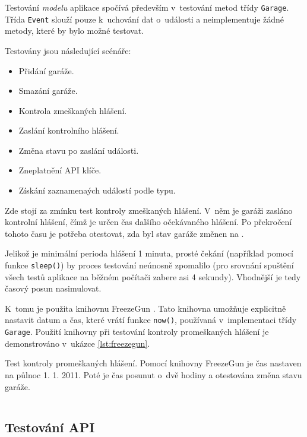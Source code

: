 Testování \textit{modelu} aplikace spočívá především v~testování metod třídy \texttt{Garage}. Třída \texttt{Event} slouží pouze k~uchování dat o~události a neimplementuje žádné metody, které by bylo možné testovat.

Testovány jsou následující scénáře:

\begin{itemize}
    \item Přidání garáže.
    \item Smazání garáže.
    \item Kontrola zmeškaných hlášení.
    \item Zaslání kontrolního hlášení.
    \item Změna stavu po zaslání události.
    \item Zneplatnění API klíče.
    \item Získání zaznamenaých událostí podle typu.
\end{itemize}

Zde stojí za zmínku test kontroly zmeškaných hlášení. V~něm je garáži zasláno kontrolní hlášení, čímž je určen čas dalšího očekávaného hlášení. Po překročení tohoto času je potřeba otestovat, zda byl stav garáže změnen na .

Jelikož je minimální perioda hlášení 1 minuta, prosté čekání (například pomocí funkce \texttt{sleep()}) by proces testování neúnosně zpomalilo (pro srovnání spuštění všech testů aplikace na běžném počítači zabere asi 4 sekundy). Vhodnější je tedy časový posun nasimulovat.

K~tomu je použita knihovnu FreezeGun \cite{freezegun}. Tato knihovna umožňuje explicitně nastavit datum a čas, které vrátí funkce \texttt{now()}, používaná v~implementaci třídy \texttt{Garage}. Použití knihovny při testování kontroly promeškaných hlášení je demonstrováno v~ukázce \ref{lst:freezegun}.

\begin{listing}[htbp]
\caption{\label{lst:freezegun} Test kontroly promeškaných hlášení. Pomocí knihovny FreezeGun je čas nastaven na půlnoc 1. 1. 2011. Poté je čas posunut o~dvě hodiny a otestována změna stavu garáže.}
\inputminted[bgcolor=codebg]{python}{source-samples/freezegun.py}
\end{listing}

\subsection{Testování API}

